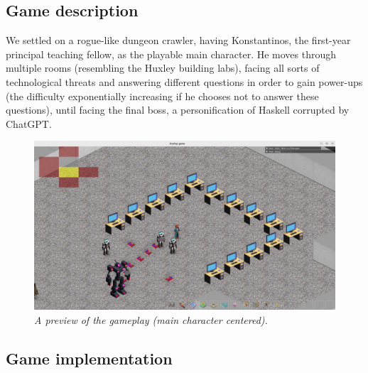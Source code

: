 \documentclass{article}
\begin{document}
\subsection{Game description}
We settled on a rogue-like dungeon crawler, having Konstantinos, the first-year principal teaching fellow, as the playable main character. He moves through multiple rooms (resembling the Huxley building labs), facing all sorts of technological threats and answering different questions in order to gain power-ups (the difficulty exponentially increasing if he chooses not to answer these questions), until facing the final boss, a personification of Haskell corrupted by ChatGPT.

\begin{figure}[H]
\includegraphics[scale=0.2]{images/gamePreview.png}
\centering
\caption{\textit{A preview of the gameplay (main character centered).}}
\end{figure}


\subsection{Game implementation}
\end{document}
